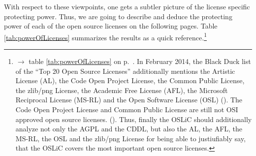With respect to these viewpoints, one gets a subtler picture of the license
specific protecting power. Thus, we are going to describe and deduce the
protecting power of each of the open source licenses on the following pages.
Table \ref{tab:powerOfLicenses} summarizes the results as a quick
reference.\footnote{$\rightarrow$ table \ref{tab:powerOfLicenses} on p.\
\pageref{tab:powerOfLicenses}. In February 2014, the Black Duck list of the
\enquote{Top 20 Open Source Licenses} additionally mentions the Artistic License
(AL), the Code Open Project License, the Common Public License, the zlib/png
License, the Academic Free License (AFL), the Microsoft Reciprocal License
(MS-RL) and the Open Software License (OSL) (\cite[cf.][\nopage
wp.]{wpBlackDuck2014a}). The Code Open Project License and Common Public License
are still not OSI approved open source licenses. (\cite[cf.][\nopage
wp.]{OSI2012b}). Thus, finally the OSLiC should additionally analyze not only
the AGPL and the CDDL, but also the AL, the AFL, the MS-RL, the OSL and the
zlib/png License for being able to justiufiably say, that the OSLiC covers the
most important open source licenses.
}

